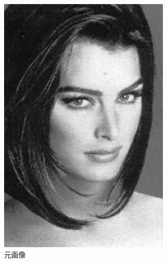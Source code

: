 \documentclass[a4paper,12pt]{jsarticle}
\begin{document}
\begin{figure}[!htbp]
\centering
\begin{subfigure}[b]{0.45\textwidth}
    \centering
    \includegraphics[width=0.9\textwidth]{./sampleimages/sample6.png}
    \caption{元画像}
\end{subfigure}
\hfill
\begin{subfigure}[b]{0.45\textwidth}
    \centering

\end{subfigure}
\end{figure}
\end{document}
